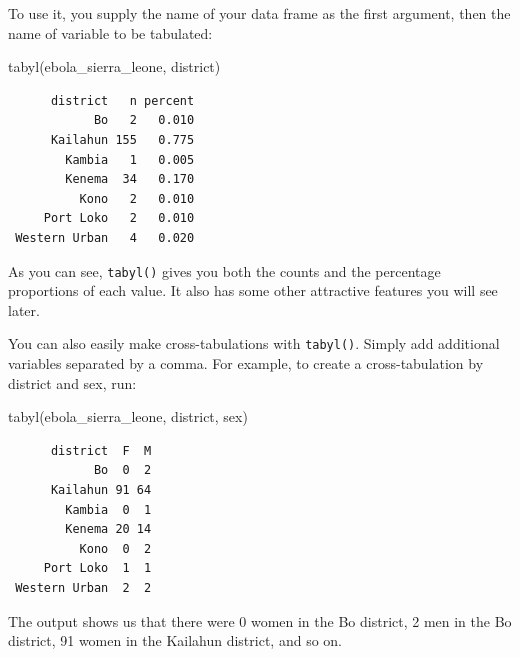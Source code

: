 \documentclass[
  letterpaper,
  DIV=11,
  numbers=noendperiod]{scrreprt}
\newenvironment{Shaded}{\begin{snugshade}}{\end{snugshade}}
\newcommand{\FunctionTok}[1]{\textcolor[rgb]{0.28,0.35,0.67}{#1}}
\newcommand{\NormalTok}[1]{\textcolor[rgb]{0.00,0.23,0.31}{#1}}
\begin{document}
To use it, you supply the name of your data frame as the first argument,
then the name of variable to be tabulated:

\begin{Shaded}
\begin{Highlighting}[]
\FunctionTok{tabyl}\NormalTok{(ebola\_sierra\_leone, district)}
\end{Highlighting}
\end{Shaded}

\begin{verbatim}
      district   n percent
            Bo   2   0.010
      Kailahun 155   0.775
        Kambia   1   0.005
        Kenema  34   0.170
          Kono   2   0.010
     Port Loko   2   0.010
 Western Urban   4   0.020
\end{verbatim}

As you can see, \texttt{tabyl()} gives you both the counts and the
percentage proportions of each value. It also has some other attractive
features you will see later.

\begin{tcolorbox}[enhanced jigsaw, titlerule=0mm, colback=white, left=2mm, breakable, opacitybacktitle=0.6, colbacktitle=quarto-callout-note-color!10!white, colframe=quarto-callout-note-color-frame, bottomtitle=1mm, opacityback=0, coltitle=black, arc=.35mm, toptitle=1mm, title=\textcolor{quarto-callout-note-color}{\faInfo}\hspace{0.5em}{Pro Tip}, leftrule=.75mm, toprule=.15mm, bottomrule=.15mm, rightrule=.15mm]

You can also easily make cross-tabulations with \texttt{tabyl()}. Simply
add additional variables separated by a comma. For example, to create a
cross-tabulation by district and sex, run:

\begin{Shaded}
\begin{Highlighting}[]
\FunctionTok{tabyl}\NormalTok{(ebola\_sierra\_leone, district, sex)}
\end{Highlighting}
\end{Shaded}

\begin{verbatim}
      district  F  M
            Bo  0  2
      Kailahun 91 64
        Kambia  0  1
        Kenema 20 14
          Kono  0  2
     Port Loko  1  1
 Western Urban  2  2
\end{verbatim}

The output shows us that there were 0 women in the Bo district, 2 men in
the Bo district, 91 women in the Kailahun district, and so on.

\end{tcolorbox}
\end{document}
